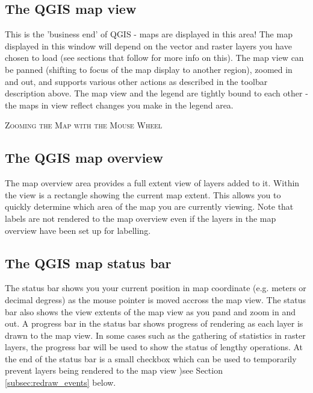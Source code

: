 \subsection{The QGIS map view}
This is the 'business end' of QGIS - maps are displayed in this area! The map
displayed in this window will depend on the vector and raster layers you have
chosen to load (see sections that follow for more info on this). The map view
can be panned (shifting to focus of the map display to another region), zoomed
in and out, and supports various other actions as described in the toolbar
description above.  The map view and the legend are tightly bound to each
other - the maps in view reflect changes you make in the legend area.  
\begin{Tip}\caption{\textsc{Zooming the Map with the Mouse
Wheel}}
\end{Tip}
\subsection{The QGIS map overview}
The map overview area provides a full extent view of layers added to it. Within the view is a rectangle showing the current map extent. This allows you to quickly determine which area of the map you are currently viewing. Note that labels are not rendered to the map overview even if the layers in the map overview have been set up for labelling.

\subsection{The QGIS map status bar} 
The status bar shows you your current position in map coordinate (e.g. meters
or decimal degress) as the mouse pointer is moved accross the map view. The status bar also shows the view extents of the map view as you pand and zoom in and out. A progress bar in the status bar shows progress of rendering as each layer is drawn to the map view. In some cases such as the gathering of statistics in raster layers, the progress bar will be used to show the status of lengthy operations. At the end of the status bar is a small checkbox which can be used to temporarily prevent layers being rendered to the map view )see Section \ref{subsec:redraw_events} below.

